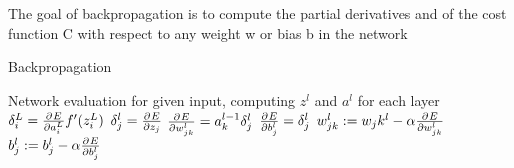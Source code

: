 The goal of backpropagation is to compute the partial derivatives  and  of the cost function C with respect to any weight w or bias b in the network


\begin{algorithm}
\caption{Backpropagation}\label{euclid}
\begin{algorithmic}[1]
\State Network evaluation for given input, computing $z^l$ and $a^l$ for each layer
  \State $\delta_i^L = \frac{\partial^{} E}{\partial a_i^L}f'(z_i^L)$
\EndFor
{}
    \State $\delta_j^l = \frac{\partial^{} E}{\partial z_j}$
  \EndFor
\EndFor
\State $\frac{\partial^{} E}{\partial w_{jk}^l} = a_k^{l-1}\delta_j^l$
\State $\frac{\partial^{} E}{\partial b_j^l} = \delta_j^l$
\State $w_{jk}^l := w_jk^l - \alpha\frac{\partial^{} E}{\partial w_{jk}^l}$
\State $b_j^l := b_j^l - \alpha\frac{\partial^{} E}{\partial b_j^l}$
\end{algorithmic}
\end{algorithm}
